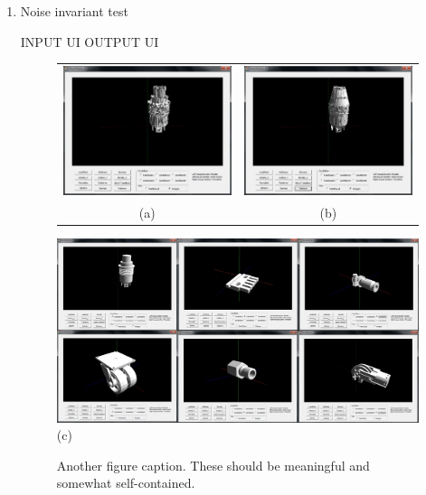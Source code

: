 \begin{enumerate}
\item Noise invariant test

INPUT UI
OUTPUT UI

\begin{figure}
\begin{center}
\begin{tabular}{cc}   %
   \includegraphics[width=0.45\linewidth]{input_noiseinvariant_test_addnoise10} & 
   \includegraphics[width=0.45\linewidth]{input_noiseinvariant_test_denoise10}  \\
   (a) & (b) \\
\end{tabular}
   \includegraphics[width=1\linewidth]{output_noiseinvariant_test10}  \\
   (c)  \\
\caption{Another figure caption. These should be meaningful and somewhat self-contained.} 
  \label{noiseinvarianttest_UI}
\end{center}
\end{figure}


\end{enumerate}
